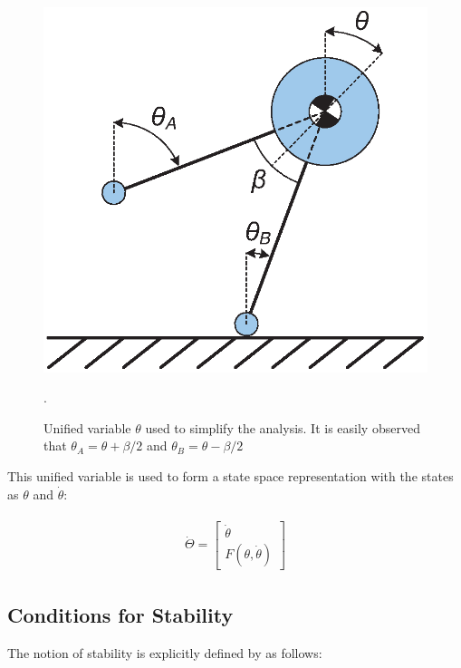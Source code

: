 \begin{figure}[!t]
	\centering
    \includegraphics[scale=0.7]{fig/fpe/fig3.eps} 
  	\caption{Unified variable $\theta$ used to simplify the analysis. It is easily observed that $\theta_A = \theta  + \beta /2$ and $\theta_B = \theta  - \beta /2$}.
	\label{fig:unified}
\end{figure}

This unified variable is used to form a state space representation with the states as $\theta$ and $\dot{\theta}$: 

\begin{equation} \label{ss}
	\begin{aligned}
				\begin{gathered}
  			\dot{\Theta} = \left[ {\begin{array}{*{20}{c}}
  {\dot \theta } \\ 
  {F(\theta, \dot{\theta})} 
							   \end{array}} \right]
		\end{gathered}
	\end{aligned}
\end{equation}

\subsection{Conditions for Stability}
The notion of stability is explicitly defined by \cite{Wight:2008vt} as follows: 

